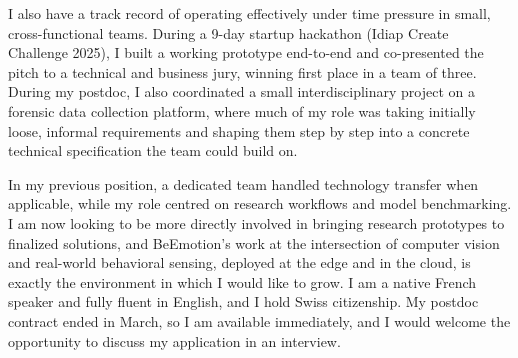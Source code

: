 \documentclass[11pt, a4paper]{awesome-cv}
\begin{document}
\begin{cvletter}
I also have a track record of operating effectively under time pressure in small, cross-functional teams. During a 9-day startup hackathon (Idiap Create Challenge 2025), I built a working prototype end-to-end and co-presented the pitch to a technical and business jury, winning first place in a team of three. During my postdoc, I also coordinated a small interdisciplinary project on a forensic data collection platform, where much of my role was taking initially loose, informal requirements and shaping them step by step into a concrete technical specification the team could build on.

In my previous position, a dedicated team handled technology transfer when applicable, while my role centred on research workflows and model benchmarking. I am now looking to be more directly involved in bringing research prototypes to finalized solutions, and BeEmotion's work at the intersection of computer vision and real-world behavioral sensing, deployed at the edge and in the cloud, is exactly the environment in which I would like to grow. I am a native French speaker and fully fluent in English, and I hold Swiss citizenship. My postdoc contract ended in March, so I am available immediately, and I would welcome the opportunity to discuss my application in an interview.


\end{cvletter}


\makeletterclosing
\end{document}
